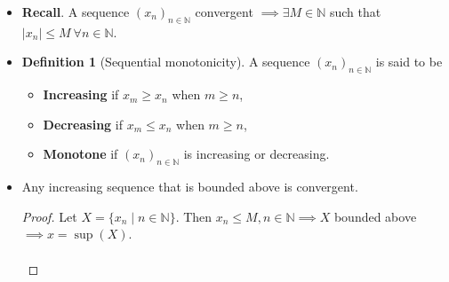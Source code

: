\documentclass{article}
\newcommand{\R}{\mathbb{R}}
\newcommand{\N}{\mathbb{N}}
\newcommand{\seq}[2]{(#1_{#2})_{#2 \in \N}}
\newcommand{\set}[2]{\{ #1 \mid #2 \}}
\newcommand{\?}{\stackrel{?}{=}}
\newcommand{\smallblacksquare}{\rule{0.5em}{0.5em}}
\theoremstyle{definition} %
\newtheorem{definition}[subsection]{Definition} %
\begin{document}
\begin{itemize}
    \begin{proof}
        Let $\seq{x}{n}$ be a convergent sequence, that is, there exists some $x \in \R$ such that for all $\varepsilon > 0$, there exists some $N(\varepsilon) \in \N$ and
        $$|x - x_n| \leq \varepsilon \ \forall n \geq N(\varepsilon).$$
        In particular, take for $\varepsilon = 1$, there is $N(1)$ such that
        $$|x_n - x| \leq 1 \ \forall n \geq N(1).$$
        Recall the reverse triangle inequality,
        \begin{alignat*}{2}
        |x_n| - |x| &\leq |x - x_n| &&\leq 1 \quad n \geq N(1) \\
        \implies \, |x_n| &\leq 1 + |x| \quad &&n \geq N(1)
        \end{alignat*}
        Let $M = \max\{|x_0|, |x_1|, \ldots, |x_{N(1) - 1}|, 1 + |x|\}$. Then certainly
        \begin{align*}
            |x_n| &\leq M \qquad n \leq N(1) \\
            |x_n| &\leq M \qquad n \geq N(1) \\
            \implies |x_n| &\leq M \qquad \forall n \in \N.
        \end{align*}
    \end{proof}
    \item \textbf{Recall}. A sequence $(x_n)_{n \in \N}$ convergent $\implies \exists M \in \N$ such that $|x_n| \leq M \ \forall n \in \N$.
    \item[]
    \begin{definition}[Sequential monotonicity]
        A sequence $\seq{x}{n}$ is said to be
    \begin{itemize}[label=\smallblacksquare]
        \item \textbf{Increasing} if $x_m \geq x_n$ when $m \geq n$,
        \item \textbf{Decreasing} if $x_m \leq x_n$ when $m \geq n$,
        \item \textbf{Monotone} if $\seq{x}{n}$ is increasing or decreasing.
    \end{itemize}
    \end{definition}
    \item[]
    \begin{lemma}
        Any increasing sequence that is bounded above is convergent.
    \end{lemma}
    \begin{proof}
        Let $X = \set{x_n}{n \in \N}$. Then $x_n \leq M, n \in \N \implies X$ bounded above $\implies x = \sup(X)$. \\\\

\end{proof}
\end{itemize}
\end{document}

